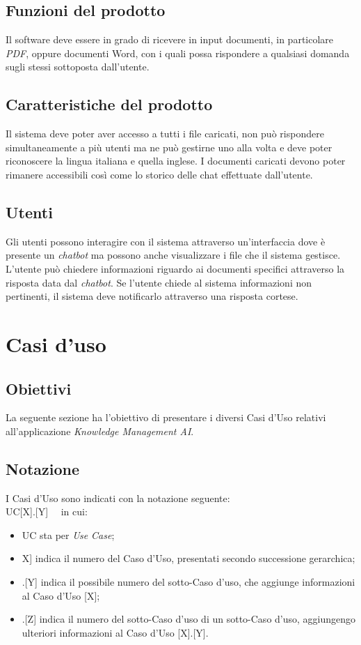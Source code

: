 \documentclass[10pt, a4paper]{article}
\begin{document}
\subsection{Funzioni del prodotto}
Il software deve essere in grado di ricevere in input documenti, in particolare \textit{PDF}, oppure documenti Word, con i quali possa rispondere a qualsiasi domanda sugli stessi sottoposta dall'utente. 
\subsection{Caratteristiche del prodotto}
Il sistema deve poter aver accesso a tutti i file caricati, non può rispondere simultaneamente a più utenti ma ne può gestirne uno alla volta e deve poter riconoscere la lingua italiana e quella inglese. I documenti caricati devono poter rimanere accessibili così come lo storico delle chat effettuate dall'utente.
\subsection{Utenti}
Gli utenti possono interagire con il sistema attraverso un'interfaccia dove è presente un \textit{chatbot} ma possono anche visualizzare i file che il sistema gestisce. L'utente può chiedere informazioni riguardo ai documenti specifici attraverso la risposta data dal \textit{chatbot}. Se l'utente chiede al sistema informazioni non pertinenti, il sistema deve notificarlo attraverso una risposta cortese.
\newpage
\section{Casi d'uso}

\subsection{Obiettivi}
La seguente sezione ha l'obiettivo di presentare i diversi Casi d'Uso relativi all'applicazione \textit{Knowledge Management AI}. 
\subsection{Notazione} 
I Casi d'Uso sono indicati con la notazione seguente: \\ UC[X].[Y] \ \  in cui:
\begin{itemize}
\item UC sta per \textit{Use Case};
\item \lbrack X] indica il numero del Caso d'Uso, presentati secondo successione gerarchica;
\item .[Y] indica il possibile numero del sotto-Caso d'uso, che aggiunge informazioni al Caso d'Uso [X];
\item .[Z] indica il numero del sotto-Caso d'uso di un sotto-Caso d'uso, aggiungengo ulteriori informazioni al Caso d'Uso [X].[Y].
\end{itemize}
\end{document}
